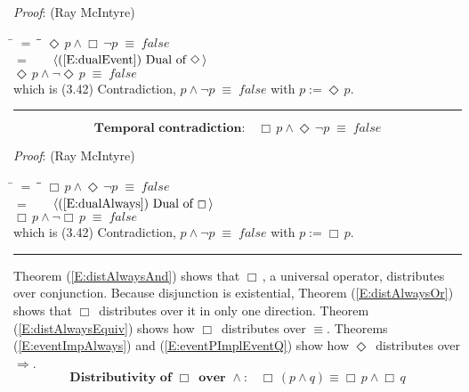 \documentclass[12pt, fleqn, leqno]{article}
\newcommand{\lgap}{2pt}                             %
\newcommand{\mymathindent}{24pt}                    %
\newcommand{\equivs}{\ensuremath{\;\equiv\;}}       %
\newcommand{\impl}{\ensuremath{\Rightarrow}}        %
\newcommand{\Event}{\Diamond\,}
\newcommand{\Always}{\Box\,}
\newcommand{\myqed}{\rule[-.23ex]{1.2ex}{2.0ex}}
\newcommand{\myqedtab}{\hspace{384pt}}              %
\newcommand{\Gll} {\langle}                         %
\newcommand{\Ggg} {\rangle}                         %
\newcommand{\Hint}[1]     {\ \ \ $\Gll              \mbox{#1} \Ggg$ }   %
\begin{document}
\emph{Proof}: (Ray McIntyre)
\begin{tabbing}
\hspace{\mymathindent} \= $= \;$ \= \myqedtab \= \kill
  \> \>   $\Event p \land \Always\neg p \equivs false$\\[\lgap]
  \> $=$  \>  \Hint{(\ref{E:dualEvent}) Dual of $\Event$}\\[\lgap]
  \> \>   $\Event p \land \neg\Event p \equivs false$\\[\lgap]
  \> which is (3.42) Contradiction, $p\land\neg p \equivs false$ with $p := \Event p$. \quad \myqed
\end{tabbing}
\begin{equation}\label{E:contradictionb}
\textbf{Temporal contradiction:}\quad \Always p \land \Event\neg p \equivs false
\end{equation}

\emph{Proof}: (Ray McIntyre)
\begin{tabbing}
\hspace{\mymathindent} \= $= \;$ \= \myqedtab \= \kill
  \> \>   $\Always p \land \Event\neg p \equivs false$\\[\lgap]
  \> $=$  \>  \Hint{(\ref{E:dualAlways}) Dual of $\Always$}\\[\lgap]
  \> \>   $\Always p \land \neg\Always p \equivs false$\\[\lgap]
  \> which is (3.42) Contradiction, $p\land\neg p \equivs false$ with $p := \Always p$. \quad \myqed
\end{tabbing}

Theorem (\ref{E:distAlwaysAnd}) shows that $\Always$, a universal operator, distributes over conjunction.
Because disjunction is existential, Theorem (\ref{E:distAlwaysOr}) shows that $\Always$ distributes over it in only one
direction.
Theorem (\ref{E:distAlwaysEquiv}) shows how $\Always$ distributes over $\equiv$.
Theorems  (\ref{E:eventImpAlways}) and (\ref{E:eventPImplEventQ}) show how $\Event$ distributes over $\impl$.
\begin{equation}\label{E:distAlwaysAnd}
\textbf{Distributivity of $\Always$ over $\land$:}\quad \Always (p \land q) \equiv \Always p \land \Always q
\end{equation}
\end{document}
